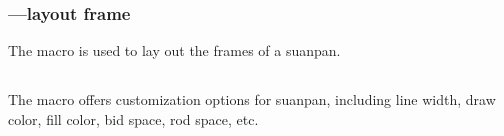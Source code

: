 \documentclass[full]{l3doc}
\begin{document}
\begin{documentation}
\begin{SideBySideExample}[frame=single,numbers=left,%
    xrightmargin=.48\linewidth,gobble=2]
  \centering
  \begin{suanpan}
  \end{suanpan}
\end{SideBySideExample}

\begin{SideBySideExample}[frame=single,numbers=left,%
    xrightmargin=.48\linewidth,gobble=2]
  \centering
  \begin{suanpan}
  \end{suanpan}
\end{SideBySideExample}

\subsubsection{---layout frame}

\begin{function}{\mkframe}
  \begin{syntax}
  \end{syntax}
\end{function}

  The  macro is used to lay out the frames of
  a suanpan.

\begin{SideBySideExample}[frame=single,numbers=left,%
    xrightmargin=.48\linewidth,gobble=2]
  \centering
  \begin{suanpan}
    \mkframe
  \end{suanpan}
\end{SideBySideExample}

\subsection{}

\begin{function}{\suanpanset}
  \begin{syntax}
     
  \end{syntax}
\end{function}

  The  macro offers customization options for suanpan,
  including line width, draw color, fill color, bid space, rod space, etc.


\end{documentation}
\end{document}
